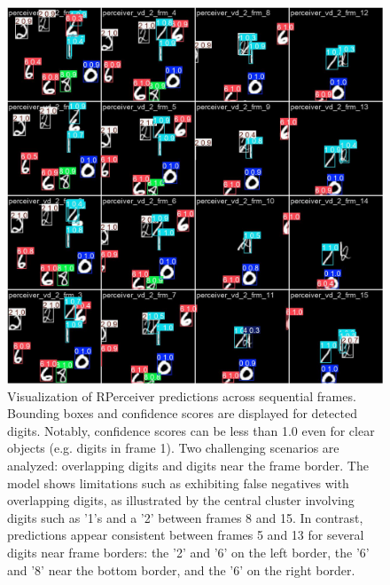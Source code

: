 \begin{figure}
    \centering
    \includegraphics[width=\textwidth]{figures/figure_methods_val_batch2_pred_recurrent_perceiver.jpg}
    \caption{Visualization of RPerceiver predictions across sequential frames. Bounding boxes and confidence scores are displayed for detected digits. Notably, confidence scores can be less than 1.0 even for clear objects (e.g. digits in frame 1). Two challenging scenarios are analyzed: overlapping digits and digits near the frame border. The model shows limitations such as exhibiting false negatives with overlapping digits, as illustrated by the central cluster involving digits such as '1's and a '2' between frames 8 and 15. In contrast, predictions appear consistent between frames 5 and 13 for several digits near frame borders: the '2' and '6' on the left border, the '6' and '8' near the bottom border, and the '6' on the right border.}
    \label{fig:figure_methods_val_batch2_pred_recurrent_perceiver}
\end{figure}

